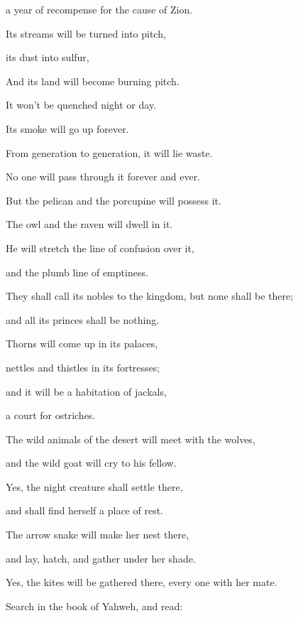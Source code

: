 {\par }{\QB a year of recompense for the cause of Zion.
\par }{\Q {}Its streams will be turned into pitch,
\par }{\QB its dust into sulfur,
\par }{\QB And its land will become burning pitch.
\par }{\Q {}It won’t be quenched night or day.
\par }{\QB Its smoke will go up forever.
\par }{\QB From generation to generation, it will lie waste.
\par }{\QB No one will pass through it forever and ever.
\par }{\Q {}But the pelican and the porcupine will possess it.
\par }{\QB The owl and the raven will dwell in it.
\par }{\Q He will stretch the line of confusion over it,
\par }{\QB and the plumb line of emptiness.
\par }{\Q {}They shall call its nobles to the kingdom, but none shall be there;
\par }{\QB and all its princes shall be nothing.
\par }{\Q {}Thorns will come up in its palaces,
\par }{\QB nettles and thistles in its fortresses;
\par }{\QB and it will be a habitation of jackals,
\par }{\QB a court for ostriches.
\par }{\Q {}The wild animals of the desert will meet with the wolves,
\par }{\QB and the wild goat will cry to his fellow.
\par }{\Q Yes, the night creature shall settle there,
\par }{\QB and shall find herself a place of rest.
\par }{\Q {}The arrow snake will make her nest there,
\par }{\QB and lay, hatch, and gather under her shade.
\par }{\QB Yes, the kites will be gathered there, every one with her mate.
\par }{\BB \par }{\Q {}Search in the book of Yahweh, and read:
}

